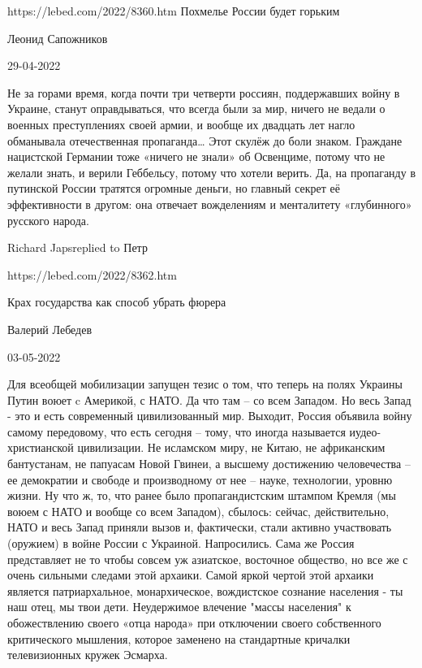 




https://lebed.com/2022/8360.htm
Похмелье России будет горьким

Леонид Сапожников

29-04-2022

Не за горами время, когда почти три четверти
россиян,
поддержавших войну в Украине, станут оправдываться, что всегда
были за мир,
ничего не ведали о военных преступлениях своей армии, и вообще их
двадцать лет
нагло обманывала отечественная пропаганда… Этот скулёж до боли
знаком. Граждане
нацистской Германии тоже «ничего не знали» об Освенциме, потому
что не желали
знать, и верили Геббельсу, потому что хотели верить. Да, на
пропаганду в
путинской России тратятся огромные деньги, но главный секрет её
эффективности в
другом: она отвечает вожделениям и менталитету «глубинного»
русского
народа. 

Richard Japsreplied to Петр

https://lebed.com/2022/8362.htm

Крах государства как способ убрать фюрера

Валерий Лебедев

03-05-2022 

Для всеобщей мобилизации запущен тезис о том,
что
теперь на полях Украины Путин воюет c Америкой, с НАТО. Да что
там – со
всем Западом. Но весь Запад - это и есть современный
цивилизованный мир.
Выходит, Россия объявила войну самому передовому, что есть
сегодня –
тому, что иногда называется иудео-христианской цивилизации. Не
исламском миру,
не Китаю, не африканским бантустанам, не папуасам Новой Гвинеи, а
высшему
достижению человечества – ее демократии и свободе и производному
от нее –
науке, технологии, уровню жизни. Ну что ж, то, что ранее было
пропагандистским штампом Кремля (мы воюем с НАТО и вообще со всем
Западом),
сбылось: сейчас, действительно, НАТО и весь Запад приняли вызов и,
фактически,
стали активно участвовать (оружием) в войне России с Украиной.
Напросились.
Сама же Россия представляет не то чтобы совсем уж азиатское,
восточное
общество, но все же с очень сильными следами этой архаики. Самой
яркой
чертой этой архаики является патриархальное, монархическое,
вождистское
сознание населения - ты наш отец, мы твои дети. Неудержимое
влечение
"массы населения" к обожествлению своего «отца народа» при
отключении
своего собственного критического мышления, которое заменено на
стандартные кричалки телевизионных кружек Эсмарха.

